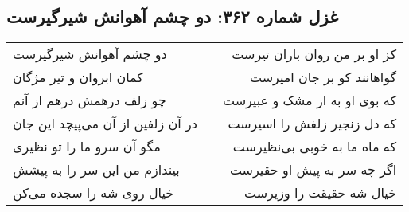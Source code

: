 \begin{center}
\section*{غزل شماره ۳۶۲: دو چشم آهوانش شیرگیرست}
\label{sec:0362}
\begin{longtable}{l p{0.5cm} r}
دو چشم آهوانش شیرگیرست
&&
کز او بر من روان باران تیرست
\\
کمان ابروان و تیر مژگان
&&
گواهانند کو بر جان امیرست
\\
چو زلف درهمش درهم از آنم
&&
که بوی او به از مشک و عبیرست
\\
در آن زلفین از آن می‌پیچد این جان
&&
که دل زنجیر زلفش را اسیرست
\\
مگو آن سرو ما را تو نظیری
&&
که ماه ما به خوبی بی‌نظیرست
\\
بیندازم من این سر را به پیشش
&&
اگر چه سر به پیش او حقیرست
\\
خیال روی شه را سجده می‌کن
&&
خیال شه حقیقت را وزیرست
\\
\end{longtable}
\end{center}

